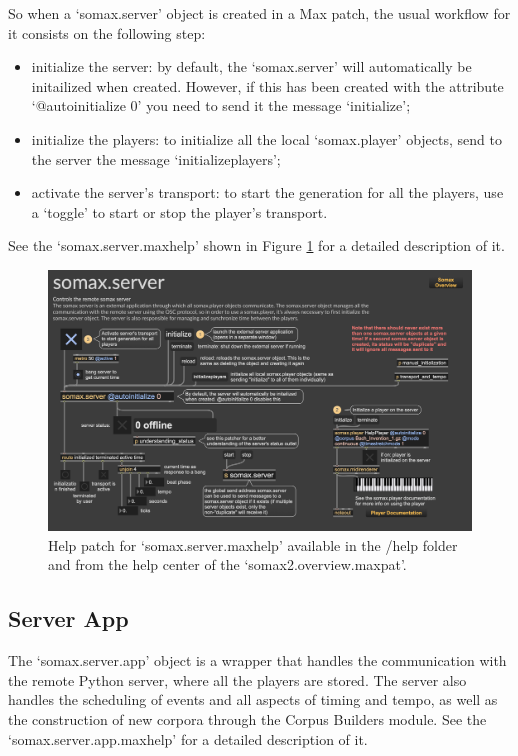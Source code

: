 So when a `somax.server' object is created in a Max patch, the usual workflow for it consists on the following step:

\begin{itemize}
    \item initialize the server: by default, the `somax.server' will automatically be initailized when created. However, if this has been created with the attribute `@autoinitialize 0' you need to send it the message `initialize';
    \item initialize the players: to initialize all the local `somax.player' objects, send to the server the message `initializeplayers';
    \item activate the server's transport: to start the generation for all the players, use a `toggle' to start or stop the player's transport.
\end{itemize}

See the `somax.server.maxhelp' shown in Figure \ref{fig:server_help} for a detailed description of it.

 \begin{figure}[H]
    \centering        
 	\includegraphics[width=1\textwidth, keepaspectratio]{img/server_help.png}
    \caption{Help patch for `somax.server.maxhelp' available in the /help folder and from the help center of the `somax2.overview.maxpat'.}
    \label{fig:server_help}
\end{figure}


\subsection{Server App}

The `somax.server.app' object is a wrapper that handles the communication with the remote Python server, where all the players are stored. The server also handles the scheduling of events and all aspects of timing and tempo, as well as the construction of new corpora through the Corpus Builders module.
See the `somax.server.app.maxhelp' for a detailed description of it.


